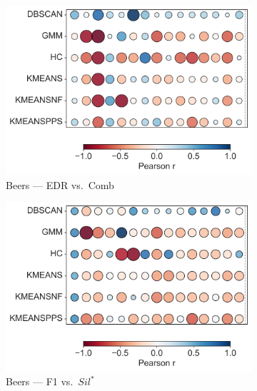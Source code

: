 \documentclass[10pt]{article} %
\numberwithin{equation}{section}
\begin{document}
\begin{figure}[htbp]  %
  \centering
  \begin{subfigure}[b]{0.33\linewidth}
    \includegraphics[width=\linewidth]{figures/6.4.3graph/BE_EDR_vs_Combined Score.pdf}
    \caption{Beers — EDR vs.\ Comb}
    \label{fig:be_edr_comb}
  \end{subfigure}\hfill
  \begin{subfigure}[b]{0.33\linewidth}
    \includegraphics[width=\linewidth]{figures/6.4.3graph/BE_F1_vs_Silhouette Score.pdf}
    \caption{Beers — F1 vs.\ $Sil^\ast$}
    \label{fig:be_f1_sil}
  \end{subfigure}\hfill
  \begin{subfigure}[b]{0.33\linewidth}

\end{subfigure}
\end{figure}
\end{document}
